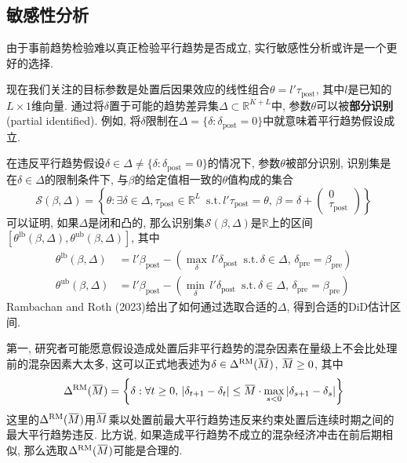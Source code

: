 \documentclass[cn,blue,14pt,screen,bibstyle=gb7714-2015]{elegantnote}
\newcommand{\overbar}[1]{\mkern 1.5mu\overline{\mkern-1.5mu#1\mkern-1.5mu}\mkern 1.5mu}
\begin{document}
\subsection{敏感性分析}
由于事前趋势检验难以真正检验平行趋势是否成立, 实行敏感性分析或许是一个更好的选择.

现在我们关注的目标参数是处置后因果效应的线性组合$\theta=l'\tau_\text{post}$, 其中$l$是已知的$L\times1$维向量. 通过将$\delta$置于可能的趋势差异集$\Delta\subset\mathbb{R}^{K+L}$中, 参数$\theta$可以被\textbf{部分识别} (partial identified). 例如, 将$\delta$限制在$\Delta=\{\delta:\delta_\text{post}=0\}$中就意味着平行趋势假设成立.

在违反平行趋势假设$\delta\in\Delta\ne\{\delta:\delta_\text{post}=0\}$的情况下, 参数$\theta$被部分识别, 识别集是在$\delta\in\Delta$的限制条件下, 与$\beta$的给定值相一致的$\theta$值构成的集合
$$\mathcal{S}(\beta,\Delta)=\left\{\theta:\exists\delta\in\Delta,\tau_\text{post}\in\mathbb{R}^L\,\,\,\mathrm{s.t.}\,l'\tau_\text{post}=\theta,\,\beta=\delta+\begin{pmatrix}                                                                                                                             0 \\
                                                                                                                                                          \tau_\text{post}
                                                                                                                                                        \end{pmatrix}\right\}$$
可以证明, 如果$\Delta$是闭和凸的, 那么识别集$\mathcal{S}(\beta,\Delta)$是$\mathbb{R}$上的区间$[\theta^{\text{lb}}(\beta,\Delta),\theta^{\text{ub}}(\beta,\Delta)]$, 其中
\begin{align*}
\theta^{\text{lb}}(\beta,\Delta)&=l'\beta_\text{post}-\left(\max_\delta\, l'\delta_\text{post}\,\,\,\mathrm{s.t.}\,\delta\in\Delta,\,\delta_\text{pre}=\beta_\text{pre}\right) \\
\theta^{\text{ub}}(\beta,\Delta)&=l'\beta_\text{post}-\left(\min_\delta\, l'\delta_\text{post}\,\,\,\mathrm{s.t.}\,\delta\in\Delta,\,\delta_\text{pre}=\beta_\text{pre}\right)
\end{align*}
Rambachan and Roth (2023)给出了如何通过选取合适的$\Delta$, 得到合适的DiD估计区间.

第一, 研究者可能愿意假设造成处置后非平行趋势的混杂因素在量级上不会比处理前的混杂因素大太多, 这可以正式地表述为$\delta\in\Delta^\text{RM}(\overbar{M})$, $\overbar{M}\ge0$, 其中
$$\Delta^\text{RM}(\overbar{M})=\left\{\delta:\forall t\ge0,\,|\delta_{t+1}-\delta_t|\leq \overbar{M}\cdot \max_{s<0}|\delta_{s+1}-\delta_s|\right\}$$
这里的$\Delta^\text{RM}(\overbar{M})$用$\overbar{M}$乘以处置前最大平行趋势违反来约束处置后连续时期之间的最大平行趋势违反. 比方说, 如果造成平行趋势不成立的混杂经济冲击在前后期相似, 那么选取$\Delta^\text{RM}(\overbar{M})$可能是合理的.
\end{document}
